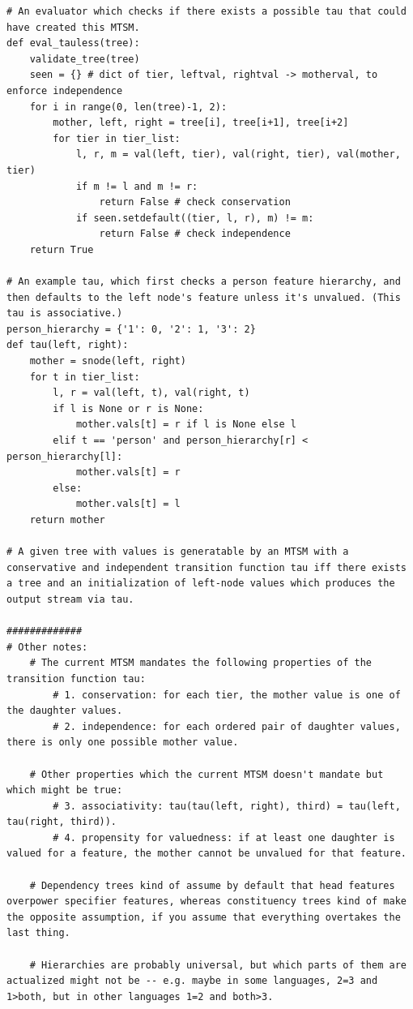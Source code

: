 \begin{verbatim}
# An evaluator which checks if there exists a possible tau that could have created this MTSM. 
def eval_tauless(tree):
    validate_tree(tree)
    seen = {} # dict of tier, leftval, rightval -> motherval, to enforce independence
    for i in range(0, len(tree)-1, 2):
        mother, left, right = tree[i], tree[i+1], tree[i+2]
        for tier in tier_list:
            l, r, m = val(left, tier), val(right, tier), val(mother, tier)
            if m != l and m != r: 
                return False # check conservation
            if seen.setdefault((tier, l, r), m) != m: 
                return False # check independence
    return True

# An example tau, which first checks a person feature hierarchy, and then defaults to the left node's feature unless it's unvalued. (This tau is associative.)
person_hierarchy = {'1': 0, '2': 1, '3': 2}
def tau(left, right):
    mother = snode(left, right)
    for t in tier_list:
        l, r = val(left, t), val(right, t)
        if l is None or r is None:
            mother.vals[t] = r if l is None else l
        elif t == 'person' and person_hierarchy[r] < person_hierarchy[l]:
            mother.vals[t] = r
        else: 
            mother.vals[t] = l
    return mother

# A given tree with values is generatable by an MTSM with a conservative and independent transition function tau iff there exists a tree and an initialization of left-node values which produces the output stream via tau. 

#############
# Other notes:
    # The current MTSM mandates the following properties of the transition function tau:
        # 1. conservation: for each tier, the mother value is one of the daughter values.
        # 2. independence: for each ordered pair of daughter values, there is only one possible mother value.

    # Other properties which the current MTSM doesn't mandate but which might be true:
        # 3. associativity: tau(tau(left, right), third) = tau(left, tau(right, third)).
        # 4. propensity for valuedness: if at least one daughter is valued for a feature, the mother cannot be unvalued for that feature. 

    # Dependency trees kind of assume by default that head features overpower specifier features, whereas constituency trees kind of make the opposite assumption, if you assume that everything overtakes the last thing. 

    # Hierarchies are probably universal, but which parts of them are actualized might not be -- e.g. maybe in some languages, 2=3 and 1>both, but in other languages 1=2 and both>3.


\end{verbatim}
